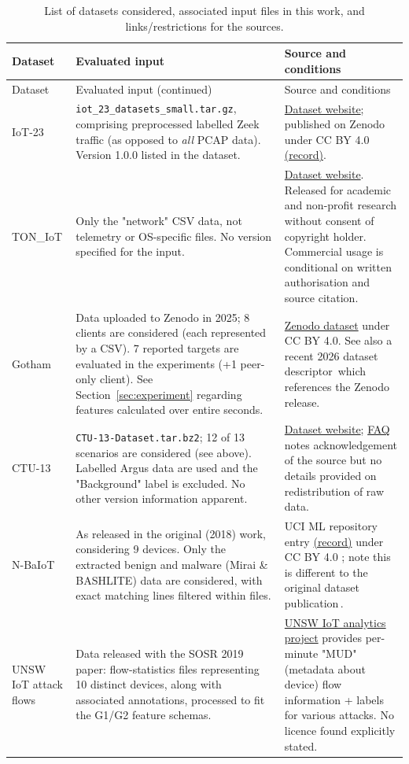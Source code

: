 {\small 
\begin{longtable}{>{\raggedright\arraybackslash}p{}>{\raggedright\arraybackslash}p{}>{\raggedright\arraybackslash}p{}} 
\caption{List of datasets considered, associated input files in this work, and links/restrictions for the sources.}\label{tab:dataset-inputs}\\
\toprule Dataset & Evaluated input & Source and conditions\\\midrule\endfirsthead
\toprule Dataset & Evaluated input (continued) & Source and conditions\\\midrule\endhead
\bottomrule\endfoot 
IoT-23 & \texttt{iot\_23\_datasets\_small.tar.gz}, comprising preprocessed labelled Zeek traffic (as opposed to \textit{all} PCAP data). Version 1.0.0 listed in the dataset. & \href{https://www.stratosphereips.org/datasets-iot23}{Dataset website}; published on Zenodo under CC BY 4.0 \href{https://doi.org/10.5281/zenodo.4743746}{(record)}.\\
TON\_IoT & Only the "network" CSV data, not telemetry or OS-specific files. No version specified for the input. & \href{https://research.unsw.edu.au/projects/toniot-datasets}{Dataset website}. Released for academic and non-profit research without consent of copyright holder. Commercial usage is conditional on written authorisation and source citation.\\
Gotham & Data uploaded to Zenodo in 2025; 8 clients are considered (each represented by a CSV). 7 reported targets are evaluated in the experiments (+1 peer-only client). See Section~\ref{sec:experiment} regarding features calculated over entire seconds. & \href{https://doi.org/10.5281/zenodo.14502760}{Zenodo dataset} under CC BY 4.0. See also a recent 2026 dataset descriptor\,\cite{belarbi2026descriptor} which references the Zenodo release.\\
CTU-13 & \texttt{CTU-13-Dataset.tar.bz2}; 12 of 13 scenarios are considered (see above). Labelled Argus data are used and the "Background" label is excluded. No other version information apparent. & \href{https://www.stratosphereips.org/datasets-ctu13}{Dataset website}; \href{https://www.stratosphereips.org/datasets-faq}{FAQ} notes acknowledgement of the source but no details provided on redistribution of raw data.\\
N-BaIoT & As released in the original (2018) work, considering 9 devices. Only the extracted benign and malware (Mirai \& BASHLITE) data are considered, with exact matching lines filtered within files. & UCI ML repository entry \href{https://doi.org/10.24432/C5RC8J}{(record)} under CC BY 4.0 \cite{nbaiotdata2018}; note this is different to the original dataset publication\,\cite{nbaiot2018}.\\
UNSW IoT attack flows & Data released with the SOSR 2019 paper: flow-statistics files representing 10 distinct devices, along with associated annotations, processed to fit the G1/G2 feature schemas. & \href{https://iotanalytics.unsw.edu.au/attack-data.html}{UNSW IoT analytics project} provides per-minute "MUD" (metadata about device) flow information + labels for various attacks. No licence found explicitly stated.\\
\end{longtable}} 

